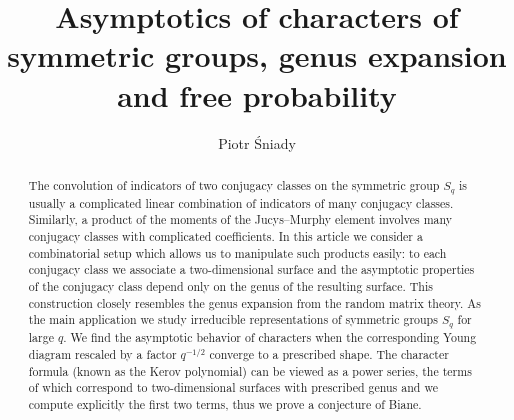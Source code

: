 \documentclass[12pt,dvips]{amsart}
\author{Piotr \'Sniady}
\title[Asymptotics of characters and genus expansion]%
{Asymptotics of characters of symmetric groups, genus expansion and
free probability}
\numberwithin{equation}{section} \numberwithin{figure}{section}
\theoremstyle{plain}
\theoremstyle{definition}
\theoremstyle{remark}
\newcommand{\Sn}[1]{{{S}}_{#1}}
\begin{document}
\begin{abstract}
The convolution of indicators of two conjugacy classes on the
symmetric group $\Sn{q}$ is usually a complicated linear combination
of indicators of many conjugacy classes. Similarly, a product of the
moments of the Jucys--Murphy element involves many conjugacy classes
with complicated coefficients. In this article we consider a
combinatorial setup which allows us to manipulate such products
easily: to each conjugacy class we associate a two-dimensional
surface and the asymptotic properties of the conjugacy class depend
only on the genus of the resulting surface. This construction
closely resembles the genus expansion from the random matrix theory.
As the main application we study irreducible representations of
symmetric groups $\Sn{q}$ for large $q$. We find the asymptotic
behavior of characters when the corresponding Young diagram rescaled
by a factor $q^{-1/2}$ converge to a prescribed shape. The character
formula (known as the Kerov polynomial) can be viewed as a power
series, the terms of which correspond to two-dimensional surfaces
with prescribed genus and we compute explicitly the first two terms,
thus we prove a conjecture of Biane.
%

\end{abstract}

\end{document}
